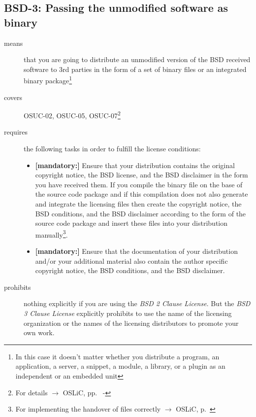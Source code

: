 \subsection{BSD-3: Passing the unmodified software as binary}

\begin{description}
\item[means] that you are going to distribute an unmodified version of the BSD
received software to 3rd parties in the form of a set of binary files or an
integrated bi\-na\-ry package\footnote{In this case it doesn't matter whether
you distribute a program, an application, a server, a snippet, a module, a
library, or a plugin as an independent or an embedded unit}
\item[covers] OSUC-02, OSUC-05, OSUC-07\footnote{For details $\rightarrow$ OSLiC, pp.\
\pageref{OSUC-02-DEF} - \pageref{OSUC-07-DEF}}
\item[requires] the following tasks in order to fulfill the license conditions:
\begin{itemize}
  
  \item  \textbf{[mandatory:]} Ensure that your distribution contains the
  original copyright notice, the BSD license, and the BSD disclaimer in the form
  you have received them. If you compile the binary file on the base of the
  source code package and if this compilation does not also generate and
  integrate the licensing files then create the copyright notice, the BSD
  conditions, and the BSD disclaimer according to the form of the source code
  package and insert these files into your distribution manually\footnote{For
  implementing the handover of files correctly $\rightarrow$ OSLiC, p.\ 
  \pageref{DistributingFilesHint}}.
  
  \item  \textbf{[mandatory:]} Ensure that the documentation of your
  distribution and/or your additional material also contain the author specific
  copyright notice, the BSD conditions, and the BSD disclaimer.
\end{itemize}

\item[prohibits] nothing explicitly if you are using the \emph{BSD 2 Clause
License}. But the \emph{BSD 3 Clause License} explicitly prohibits to use the
name of the licensing organization or the names of the licensing distributors to
promote your own work.

\end{description}

